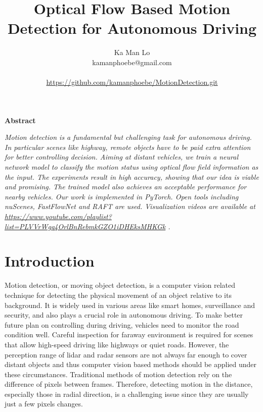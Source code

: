 \documentclass[10pt, a4paper, twocolumn]{article}
\title{\textbf{Optical Flow Based Motion Detection for Autonomous Driving}}
\author{Ka Man Lo \\ 
    \small kamanphoebe@gmail.com \\\\ 
    \small \url{https://github.com/kamanphoebe/MotionDetection.git}
}
\date{}
\begin{document}
\maketitle

\begin{center}
    \textbf{Abstract}
\end{center}
\vspace{-.25cm}
\begin{adjustwidth}{20pt}{20pt}
    \textit{
    \indent Motion detection is a fundamental but challenging task for autonomous driving. In particular scenes like highway, remote objects have to be paid extra attention for better controlling decision. Aiming at distant vehicles, we train a neural network model to classify the motion status using optical flow field information as the input. The experiments result in high accuracy, showing that our idea is viable and promising. The trained model also achieves an acceptable performance for nearby vehicles. Our work is implemented in PyTorch. Open tools including nuScenes, FastFlowNet and RAFT are used. Visualization videos are available at \url{https://www.youtube.com/playlist?list=PLVVrWgq4OrlBnRebmkGZO1iDHEksMHKGk} .
    }
\end{adjustwidth}


\section{\large Introduction}
    
    Motion detection, or moving object detection, is a computer vision related technique for detecting the physical movement of an object relative to its background. It is widely used in various areas like smart homes, surveillance and security, and also plays a crucial role in autonomous driving. To make better future plan on controlling during driving, vehicles need to monitor the road condition well. Careful inspection for faraway environment is required for scenes that allow high-speed driving like highways or quiet roads. However, the perception range of lidar and radar sensors are not always far enough to cover distant objects and thus computer vision based methods should be applied under these circumstances. Traditional methods of motion detection rely on the difference of pixels between frames. Therefore, detecting motion in the distance, especially those in radial direction, is a challenging issue since they are usually just a few pixels changes.
    
\end{document}
